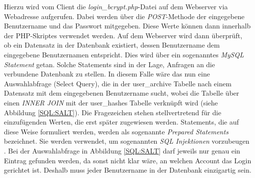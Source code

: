 \documentclass[../main.tex]{subfiles}
\begin{document}
	Hierzu wird vom Client die \emph{login\_bcrypt.php}-Datei auf dem Webserver via Webadresse aufgerufen. Dabei werden über die \emph{POST}-Methode der eingegebene Benutzername und das Passwort mitgegeben. Diese Werte können dann innerhalb der PHP-Skriptes verwendet werden. Auf dem Webserver wird dann überprüft, ob ein Datensatz in der Datenbank existiert, dessen Benutzername dem eingegebene Benutzernamen entspricht. Dies wird über ein sogenanntes \emph{MySQL Statement} getan. Solche Statements sind in der Lage, Anfragen an die verbundene Datenbank zu stellen. In diesem Falle wäre das nun eine Auswahlabfrage (Select Query), die in der user\_archive Tabelle nach einem Datensatz mit dem eingegebenen Benutzername sucht, wobei die Tabelle über einen \emph{INNER JOIN} mit der user\_hashes Tabelle verknüpft wird (siehe Abbildung \ref{SQL:SALT}). Die Fragezeichen stehen stellvertretend für die einzufügenden Werten, die erst später zugewiesen werden. Statements, die auf diese Weise formuliert werden, werden als sogenannte \emph{Prepared Statements} bezeichnet. Sie werden verwendet, um sogenannten \emph{SQL Injektionen} vorzubeugen \cite{preparedstatement}. Bei der Auswahlabfrage in Abbildung \ref{SQL:SALT} darf jeweils nur genau ein Eintrag gefunden werden, da sonst nicht klar wäre, an welchen Account das Login gerichtet ist. Deshalb muss jeder Benutzername in der Datenbank einzigartig sein.
 
\end{document}
